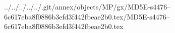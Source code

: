 ../../../../../.git/annex/objects/MP/gx/MD5E-s4476--6c617eba8f0886b3efd3f442fbeae2b0.tex/MD5E-s4476--6c617eba8f0886b3efd3f442fbeae2b0.tex